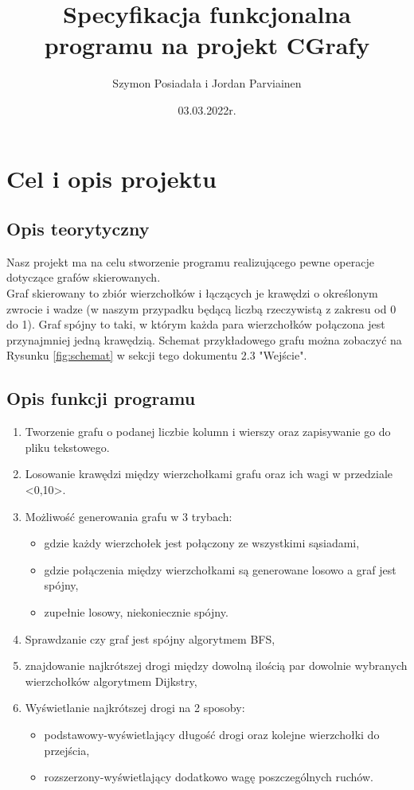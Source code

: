 \documentclass{article}
\title{Specyfikacja funkcjonalna programu na projekt CGrafy}
\author{Szymon Posiadała i Jordan Parviainen}
\date{03.03.2022r.}
\begin{document}
\maketitle

\thispagestyle{firststyle}
\section{Cel i opis projektu}
\subsection{Opis teorytyczny}
Nasz projekt ma na celu stworzenie programu realizującego pewne operacje dotyczące grafów skierowanych.\\
Graf skierowany to zbiór wierzchołków i łączących je krawędzi o określonym zwrocie i wadze (w naszym przypadku będącą liczbą rzeczywistą z zakresu od 0 do 1). Graf spójny to taki, w którym każda para wierzchołków połączona jest przynajmniej jedną krawędzią. Schemat przykładowego grafu można zobaczyć na Rysunku \ref{fig:schemat} w sekcji tego dokumentu 2.3 "Wejście".
\subsection{Opis funkcji programu}
\begin{enumerate}
\item Tworzenie grafu o podanej liczbie kolumn i wierszy oraz zapisywanie go do pliku tekstowego.
\item Losowanie krawędzi między wierzchołkami grafu oraz ich wagi w przedziale <0,10>.
\item Możliwość generowania grafu w 3 trybach:
\begin{itemize}
\item gdzie każdy wierzchołek jest połączony ze wszystkimi sąsiadami,
\item gdzie połączenia między wierzchołkami są generowane losowo a graf jest spójny,
\item zupełnie losowy, niekoniecznie spójny.
\end{itemize}
\item Sprawdzanie czy graf jest spójny algorytmem BFS,
\item znajdowanie najkrótszej drogi między dowolną ilością par dowolnie wybranych wierzchołków algorytmem Dijkstry,
\item Wyświetlanie najkrótszej drogi na 2 sposoby:
\begin{itemize}
\item podstawowy-wyświetlający długość drogi oraz kolejne wierzchołki do przejścia,
\item rozszerzony-wyświetlający dodatkowo wagę poszczególnych ruchów.
\end{itemize}

\end{enumerate}
\end{document}
